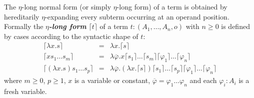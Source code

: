 \documentclass{llncs}
\newcommand\defname[1]{{\bf\em #1}\index{#1}}
\newcommand{\elnf}[1]{\lceil #1\rceil} %
\begin{document}
The $\eta$-long normal form (or simply $\eta$-long form) of a term
is obtained by hereditarily $\eta$-expanding every subterm occurring
at an operand position. Formally the \defname{$\eta$-long form}
$\elnf{t}$ of a term $t: (A_1,\ldots,A_n,o)$ with $n \geq 0$ is
defined by cases according to the syntactic shape of $t$:
\begin{eqnarray*}
  \elnf{\lambda x . s } &=& \lambda x . \elnf{s} \\
  \elnf{x s_1 \ldots s_m } &=& \lambda \overline{\varphi} . x \elnf{s_1}\ldots \elnf{s_m} \elnf{\varphi_1} \ldots \elnf{\varphi_n} \\
  \elnf{(\lambda x . s) s_1 \ldots s_p } &=& \lambda \overline{\varphi} . (\lambda x . \elnf{s}) \elnf{s_1} \ldots \elnf{s_p} \elnf{\varphi_1} \ldots \elnf{\varphi_n}
\end{eqnarray*}
where $m \geq 0$, $p\geq 1$, $x$ is a  variable or constant, $\overline{\varphi} = \varphi_1 \ldots \varphi_n$ and each $\varphi_i : A_i$ is a fresh variable.

\end{document}
